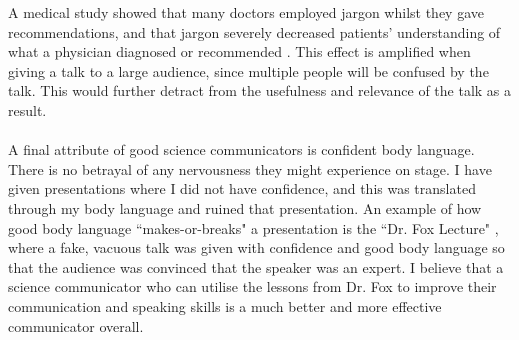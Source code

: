 A medical study showed that many doctors employed jargon whilst they gave recommendations, and that
jargon severely decreased patients' understanding of what a physician diagnosed or recommended
\cite{castro2007babel}.
This effect is amplified when giving a talk to a large audience, since multiple people will be
confused by the talk.
This would further detract from the usefulness and relevance of the talk as a result.\\
\\
A final attribute of good science communicators is confident body language.
There is no betrayal of any nervousness they might experience on stage.
I have given presentations where I did not have confidence, and this was translated through my body
language and ruined that presentation.
An example of how good body language ``makes-or-breaks" a presentation is the ``Dr. Fox Lecture"
\cite{naftulin1973doctor}, where a fake, vacuous talk was given with confidence and good body
language so that the audience was convinced that the speaker was an expert.
I believe that a science communicator who can utilise the lessons from Dr. Fox to improve their
communication and speaking skills is a much better and more effective communicator overall.
